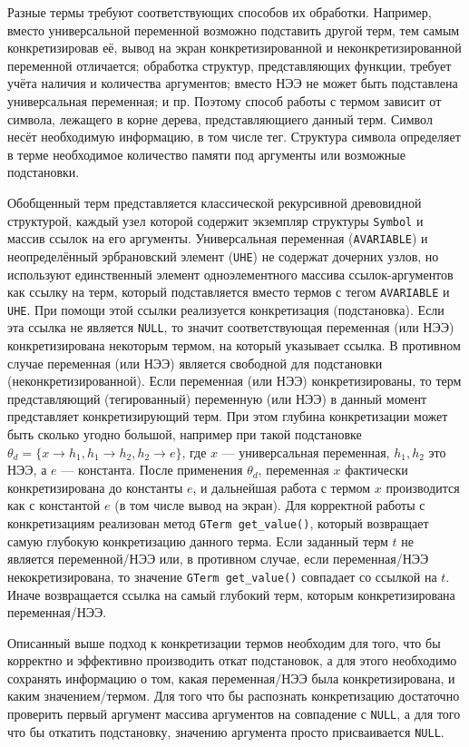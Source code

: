 Разные термы требуют соответствующих способов их обработки. Например, вместо универсальной переменной возможно подставить другой терм, тем самым конкретизировав её, вывод на экран конкретизированной и неконкретизированной переменной отличается; обработка  структур, представляющих функции, требует учёта наличия и количества аргументов; вместо НЭЭ не может быть подставлена универсальная переменная; и пр. Поэтому способ работы с термом зависит от символа, лежащего в корне дерева, представляющиего данный терм. Символ несёт необходимую информацию, в том числе тег. Структура символа определяет в терме необходимое количество памяти под аргументы или возможные подстановки.

Обобщенный терм представляется классической рекурсивной древовидной структурой, каждый узел которой содержит экземпляр структуры \texttt{Symbol} и массив ссылок на его аргументы. Универсальная переменная (\texttt{AVARIABLE}) и неопределённый эрбрановский элемент (\texttt{UHE}) не содержат дочерних узлов, но используют единственный элемент одноэлементного массива ссылок-аргументов как ссылку на терм, который подставляется вместо термов с тегом \texttt{AVARIABLE} и \texttt{UHE}. При помощи этой ссылки реализуется конкретизация (подстановка). Если эта ссылка не является \texttt{NULL}, то значит соответствующая переменная (или НЭЭ) конкретизирована некоторым термом, на который указывает ссылка. В противном случае переменная (или НЭЭ) является свободной для подстановки (неконкретизированной). Если переменная (или НЭЭ) конкретизированы, то терм представляющий (тегированный) переменную (или НЭЭ) в данный момент представляет конкретизирующий терм. При этом глубина конкретизации может быть сколько угодно большой, например при такой подстановке ${\theta}_d = \{x \rightarrow h_1, h_1 \rightarrow h_2, h_2 \rightarrow e \}$, где $x$ --- универсальная переменная, $h_1, h_2$ это НЭЭ, а $e$ --- константа. После применения ${\theta}_d$, переменная $x$ фактически конкретизирована до константы $e$, и дальнейшая работа с термом $x$ производится как с константой $e$ (в том числе вывод на экран). Для корректной работы с конкретизациям реализован метод {\tt GTerm get\_value()}, который возвращает самую глубокую конкретизацию данного терма. Если заданный терм $t$ не является переменной/НЭЭ или, в противном случае, если переменная/НЭЭ некокретизирована, то значение \texttt{GTerm get\_value()} совпадает со ссылкой на $t$. Иначе возвращается ссылка на самый глубокий терм, которым конкретизирована переменная/НЭЭ.

Описанный выше подход к конкретизации термов необходим для того, что бы корректно и эффективно производить откат подстановок, а для этого необходимо сохранять информацию о том, какая переменная/НЭЭ была конкретизирована, и каким значением/термом. Для того что бы распознать конкретизацию достаточно проверить первый аргумент массива аргументов на совпадение с \texttt{NULL}, а для того что бы откатить подстановку, значению аргумента просто присваивается \texttt{NULL}.

